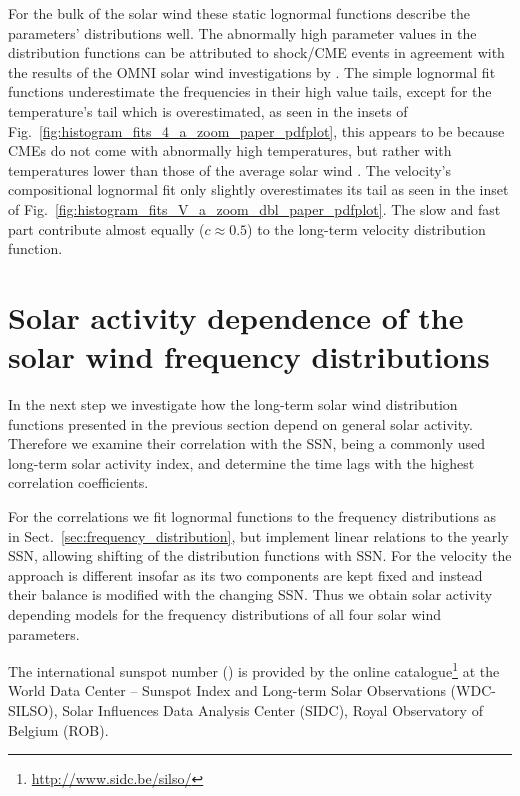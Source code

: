For the bulk of the solar wind these static lognormal functions describe the parameters' distributions well. The abnormally high parameter values in the distribution functions can be attributed to shock/CME events in agreement with the results of the OMNI solar wind investigations by \citet{Richardson2012}. The simple lognormal fit functions underestimate the frequencies in their high value tails, except for the temperature’s tail which is overestimated, as seen in the insets of Fig.~\ref{fig:histogram_fits_4_a_zoom_paper_pdfplot}, this appears to be because CMEs do not come with abnormally high temperatures, but rather with temperatures lower than those of the average solar wind \citep{Forsyth2006}. The velocity's compositional lognormal fit only slightly overestimates its tail as seen in the inset of Fig.~\ref{fig:histogram_fits_V_a_zoom_dbl_paper_pdfplot}.
The slow and fast part contribute almost equally ($c \approx 0.5$) to the long-term velocity distribution function.



\section{Solar activity dependence of the solar wind frequency distributions}
\label{sec:solar_activity_variations}
In the next step we investigate how the long-term solar wind distribution functions presented in the previous section depend on general solar activity. Therefore we examine their correlation with the SSN, being a commonly used long-term solar activity index, and determine the time lags with the highest correlation coefficients.

For the correlations we fit lognormal functions to the frequency distributions as in Sect.~\ref{sec:frequency_distribution}, but implement linear relations to the yearly SSN, allowing shifting of the distribution functions with SSN. For the velocity the approach is different insofar as its two components are kept fixed and instead their balance is modified with the changing SSN. Thus we obtain solar activity depending models for the frequency distributions of all four solar wind parameters.

The international sunspot number (\citeyear{sidc}) is provided by the online catalogue\footnote{\url{http://www.sidc.be/silso/}} at the World Data Center -- Sunspot Index and Long-term Solar Observations (WDC-SILSO), Solar Influences Data Analysis Center (SIDC), Royal Observatory of Belgium (ROB).

